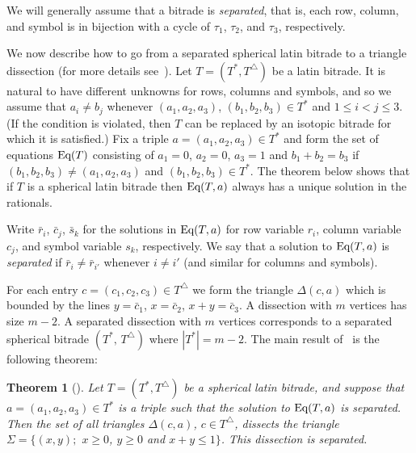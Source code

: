 \documentclass[12pt,amstags,fleqn]{article}
\theoremstyle{plain}
\newtheorem{theorem}{Theorem}[section]
\theoremstyle{definition}
\theoremstyle{definition}
\newcommand{\Tidentity}{\textnormal{(T1)}\xspace}
\newcommand{\Tcycledisjoint}{\textnormal{(T2)}\xspace}
\newcommand{\Tfpf}{\textnormal{(T3)}\xspace}
\newcommand{\Ttransitive}{\textnormal{(T4)}\xspace}
\newcommand{\darts}{\Omega}
\def\ll{{\textstyle \ast}}
\def\rr{{\scriptscriptstyle \triangle}}
\newcommand{\opa}{\ll}
\newcommand{\opb}{\rr}
\newcommand{\eq}{\textnormal{Eq}}
\begin{document}

We will generally assume that a bitrade is {\em separated}, that is,
each row, column, and symbol is in bijection with a cycle of $\tau_1$,
$\tau_2$, and $\tau_3$, respectively.

We now describe how to go from a separated spherical latin bitrade to a
triangle dissection (for more details see~\cite{alesdissections}).  
Let $T= (T^\ll, T^\rr)$ be a latin bitrade. It is natural to have
different unknowns for rows, columns and symbols, and so we assume
that $a_i \ne b_j$ whenever $(a_1,a_2,a_3)$, $(b_1,b_2,b_3) \in T^\ll$
and $1 \le i < j \le 3$.  (If the condition is violated,  then $T$
can be replaced by an isotopic bitrade for which it is satisfied.)
Fix a triple $a = (a_1,a_2,a_3) \in T^\ll$ and form the set of equations
$\eq(T)$ consisting of
$a_1=0$, $a_2=0$, $a_3 =1$
and 
$b_1+b_2 = b_3$  if $(b_1,b_2,b_3) \neq (a_1,a_2,a_3)$
and $(b_1,b_2,b_3) \in T^\ll$.
The theorem below shows that if $T$ is a spherical latin
bitrade then $\eq(T, a)$ always has a unique solution in the rationals.

Write
$\bar r_i$,
$\bar c_j$,
$\bar s_k$
for the solutions in $\eq(T, a)$ for row variable $r_i$, column variable
$c_j$, and symbol variable $s_k$, respectively. We say that 
a solution to $\eq(T, a)$ is {\em separated} if 
$\bar r_i \neq \bar r_{i'}$ whenever $i \neq i'$ (and similar for
columns and symbols).

For each entry $c = (c_1,c_2,c_3) \in T^\rr$ we form the triangle
$\Delta(c,a)$ which is bounded by the lines
$y = \bar c_1$,
$x = \bar c_2$,
$x + y = \bar c_3$.
A dissection with $m$ vertices has size $m-2$. A separated dissection 
with $m$ vertices corresponds to a separated spherical bitrade
$(T^{\opa},\, T^{\opb})$ where $\left| T^{\opa} \right| = m-2$.  
The main result of~\cite{alesdissections} is the following theorem:

\begin{theorem}[\cite{alesdissections}]\label{sepdissections}
Let $T=(T^\ll, T^\rr)$ be a spherical latin bitrade,
and suppose that $a=(a_1,a_2,a_3) \in T^\ll$ is a triple such
that the solution to $\eq(T,a)$ is separated. Then the set
of all triangles $\Delta(c,a)$, $c \in T^\rr$, dissects the triangle
$\Sigma = \{(x,y);$ $x\ge 0$, $y\ge 0$ and $x+y \le 1\}$. This
dissection is separated.
\end{theorem}
\end{document}
